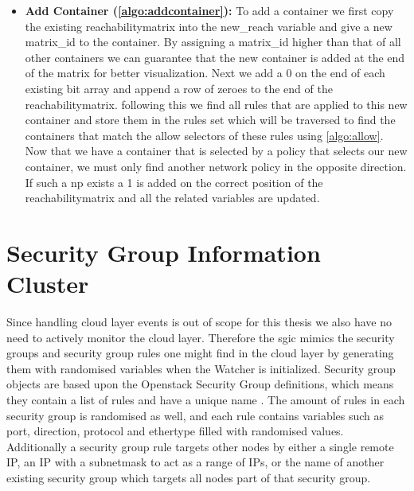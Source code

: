 \begin{itemize}
    \item \textbf{Add Container (\autoref{algo:addcontainer}):} To add a container we first copy the existing reachabilitymatrix into the new\_reach variable and give a new matrix\_id to the container. By assigning a matrix\_id higher than that of all other containers we can guarantee that the new container is added at the end of the matrix for better visualization. Next we add a 0 on the end of each existing bit array and append a row of zeroes to the end of the reachabilitymatrix. following this we find all rules that are applied to this new container and store them in the rules set which will be traversed to find the containers that match the allow selectors of these rules using \autoref{algo:allow}. Now that we have a container that is selected by a policy that selects our new container, we must only find another network policy in the opposite direction. If such a \acrshort{np} exists a 1 is added  on the correct position of the reachabilitymatrix and all the related variables are updated.
    
\end{itemize}






\newpage
\section{Security Group Information Cluster} \label{impl:sgic}
Since handling cloud layer events is out of scope for this thesis we also have no need to actively monitor the cloud layer. Therefore the \acrlong{sgic} mimics the security groups and security group rules one might find in the cloud layer by generating them with randomised variables when the Watcher is initialized. Security group objects are based upon the Openstack Security Group definitions, which means they contain a list of rules and have a unique name \cite{secgroups}. The amount of rules in each security group is randomised as well, and each rule contains variables such as port, direction, protocol and ethertype filled with randomised values. Additionally a security group rule targets other nodes by either a single remote IP, an IP with a subnetmask to act as a range of IPs, or the name of another existing security group which targets all nodes part of that security group.
\\[10pt]

